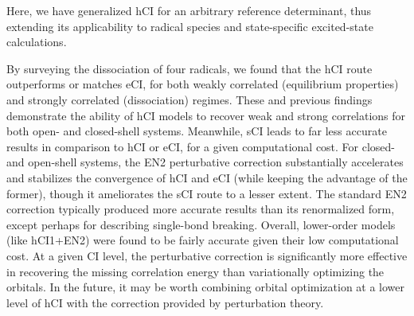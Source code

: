 \documentclass[aip,jcp,reprint,noshowkeys,superscriptaddress]{revtex4-1}
\begin{document}
Here, we have generalized hCI \cite{Kossoski_2022} for an arbitrary reference determinant, thus extending its applicability to radical species and state-specific excited-state calculations.

By surveying the dissociation of four radicals,
we found that the hCI route outperforms or matches eCI, for both weakly correlated (equilibrium properties) and strongly correlated (dissociation) regimes.
These and previous \cite{Kossoski_2022} findings demonstrate the ability of hCI models to recover weak and strong correlations for both open- and closed-shell systems.
Meanwhile, sCI leads to far less accurate results in comparison to hCI or eCI, for a given computational cost.
For closed- and open-shell systems, the EN2 perturbative correction
substantially accelerates and stabilizes the convergence of hCI and eCI (while keeping the advantage of the former),
though it ameliorates the sCI route to a lesser extent.
The standard EN2 correction typically produced more accurate results than its renormalized form, except perhaps for describing single-bond breaking.
Overall, lower-order models (like hCI1+EN2) were found to be fairly accurate given their low computational cost.
At a given CI level, the perturbative correction is significantly more effective in recovering the missing correlation energy than variationally optimizing the orbitals. \cite{Kossoski_2022}
In the future, it may be worth combining orbital optimization at a lower level of hCI \cite{Kossoski_2022} with the correction provided by perturbation theory.
\end{document}
